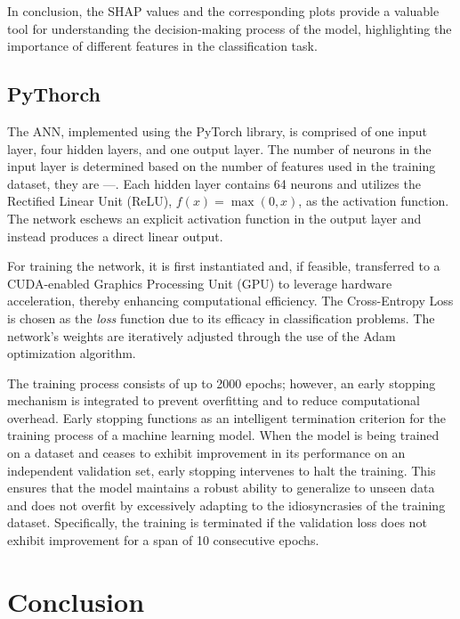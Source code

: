 In conclusion, the SHAP values and the corresponding plots provide a valuable tool for understanding the decision-making process of the model, highlighting the importance of different features in the classification task. 


\subsection{PyThorch}
The ANN, implemented using the PyTorch library, is comprised of one input layer, four hidden layers, and one output layer. The number of neurons in the input layer is determined based on the number of features used in the training dataset, they are ---. Each hidden layer contains 64 neurons and utilizes the Rectified Linear Unit (ReLU), $ f(x) = \max(0, x) $, as the activation function. The network eschews an explicit activation function in the output layer and instead produces a direct linear output.

For training the network, it is first instantiated and, if feasible, transferred to a CUDA-enabled Graphics Processing Unit (GPU) to leverage hardware acceleration, thereby enhancing computational efficiency. The Cross-Entropy Loss is chosen as the \textit{loss} function due to its efficacy in classification problems. The network's weights are iteratively adjusted through the use of the Adam optimization algorithm.

The training process consists of up to 2000 epochs; however, an early stopping mechanism is integrated to prevent overfitting and to reduce computational overhead. Early stopping functions as an intelligent termination criterion for the training process of a machine learning model. When the model is being trained on a dataset and ceases to exhibit improvement in its performance on an independent validation set, early stopping intervenes to halt the training. This ensures that the model maintains a robust ability to generalize to unseen data and does not overfit by excessively adapting to the idiosyncrasies of the training dataset. 
Specifically, the training is terminated if the validation loss does not exhibit improvement for a span of 10 consecutive epochs.



\section{Conclusion}

